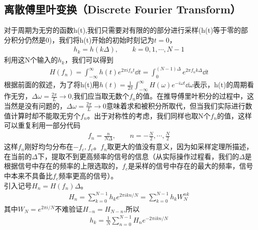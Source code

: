 \subsection{离散傅里叶变换（Discrete Fourier Transform）}
对于周期为无穷的函数h(t),我们只需要对有限的的部分进行采样(h(t)等于零的部分积分仍然是0)，我们将h(t)开始的初始时刻记为$t=0$，
\begin{align}
    h_k=h(k\Delta),\qquad k=0,1,\cdots,N-1
\end{align}
利用这N个输入的$h_k$，我们可以得到
\begin{align}
    H(f_n)=\int_{-\infty}^{\infty} h(t)e^{2\pi i f_n t}\dd{t}=\int_{0}^{(N-1)\Delta} e^{2\pi f_n k\Delta}\dd{t}    
\end{align}
根据前面的叙述，为了将h(t)用$h(t)=\frac{1}{2\pi}\int_{-\infty}^{\infty}H(\omega)e^{-i\omega t}\dd{\omega}$表示，h(t)的周期看作无穷，$\Delta\omega=\frac{2\pi}{L}\rightarrow 0$,我们应当取无数个$f_n$的值。在推导傅里叶积分的过程中，这当然是没有问题的，$\Delta\omega=\frac{2\pi}{L}\rightarrow 0$意味着求和被积分所取代，但当我们实际进行数值计算时却不能取无穷个$f_n$。出于对称性的考虑，我们同样也取N个$f_n$的值，这样可以重复利用一部分代码
\begin{align}
    f_n=\frac{n}{N\Delta},\qquad n=-\frac{N}{2},\cdots,\frac{N}{2}
\end{align}
这样$f_n$刚好均匀分布在$-f_c,f_c$。$f_n$取更大的值没有意义，因为如采样定理所描述，在当前的$\Delta$下，提取不到更高频率的信号的信息（从实际操作过程看，我们的$\Delta$是根据信号中存在的频率的上限选取的，$f_c$是采样的信号中存在的最大的频率，信号中本来不具备比$f_c$频率更高的信号）。\\
引入记号$H_n=H(f_n)\Delta$。
\begin{align}
H_n=\sum_{k=0}^{N-1}h_k e^{2\pi ikn/N}=\sum_{k=0}^{N-1}h_k W_N^{nk}\label{N2}
\end{align}
其中$W_N=e^{2\pi i/N}$不难验证$H_{-n}=H_{N-n}$,所以
\begin{align}
    h_k=\frac{1}{N}\sum_{n=0}^{N-1}H_ne^{-2\pi ikn/N}
\end{align}
